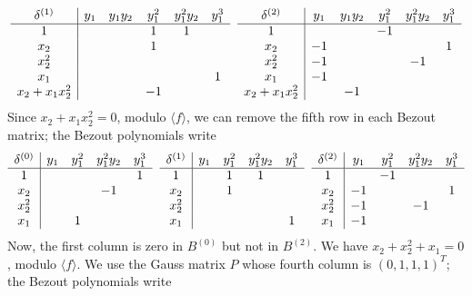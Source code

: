 \documentclass{standalone}
\begin{document}
$$
\begin{array}{c|ccccc}
	\delta^{(1)}  & y_1 & y_1y_2 & y_1^2 & y_1^2y_2 & y_1^3 \\
	\hline
	1  &  &  & 1 & 1 & \\
	x_2  &  &  & 1 &  & \\
	x_2^2  &  &  &  &  & \\
	x_1  &  &  &  &  & 1 \\
	x_2 + x_1x_2^2  &  &  & -1 &  &
\end{array}
\hspace{0.2cm}
\begin{array}{c|ccccc}
	\delta^{(2)} & y_1 & y_1y_2 & y_1^2 & y_1^2y_2 & y_1^3 \\
	\hline
	1  &  &  & -1 &  & \\
	x_2  & -1 &  &  &  & 1 \\
	x_2^2  & -1 &  &  & -1 & \\
	x_1  & -1 &  &  &  & \\
	x_2 + x_1x_2^2 &  & -1 &  &  &
\end{array}
$$
Since $x_2 + x_1x_2^{2} = 0$, modulo $\langle f \rangle$, we can remove the fifth row in each Bezout matrix; the Bezout polynomials write
$$
\begin{array}{c|cccc}
	\delta^{(0)} & y_1 & y_1^2 & y_1^2y_2 & y_1^3 \\
	\hline
	1  &   &  &  & 1 \\
	x_2  &  &  & -1 & \\
	x_2^2  &  &  &  & \\
	x_1  &  & 1 &  &
\end{array}
\hspace{0.2cm}
\begin{array}{c|cccc}
	\delta^{(1)}  & y_1 & y_1^2 & y_1^2y_2 & y_1^3 \\
	\hline
	1  &  & 1 & 1 & \\
	x_2  &  & 1 &  & \\
	x_2^2  &  &  &  & \\
	x_1  &  &  &  & 1
\end{array}
\hspace{0.2cm}
\begin{array}{c|cccc}
	\delta^{(2)} & y_1 & y_1^2 & y_1^2y_2 & y_1^3 \\
	\hline
	1  &  & -1 &  & \\
	x_2  & -1 &  &  & 1 \\
	x_2^2  & -1 &  & -1 & \\
	x_1  & -1 &  &  &
\end{array}
$$
Now, the first column is zero in $B^{(0)}$ but not in $B^{(2)}$. We have $x_2 + x_2^{2} + x_1 = 0$, modulo $\langle f \rangle$. We use the Gauss matrix $P$ whose fourth column is $(0, 1, 1, 1)^{T}$; the Bezout polynomials write
\end{document}
